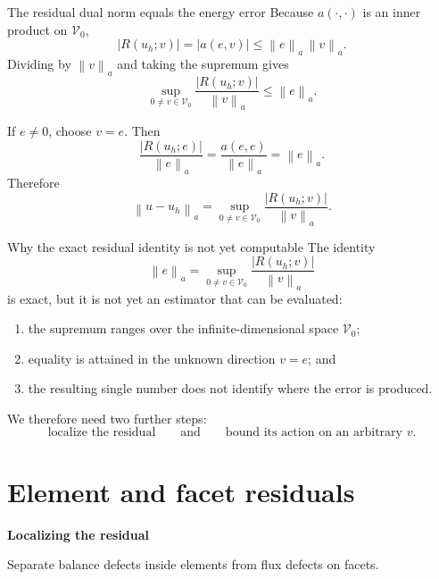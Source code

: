 \documentclass[11pt,aspectratio=169]{beamer}
\newcommand{\Vzero}{\mathcal V_0}
\newcommand{\norm}[2][]{\left\lVert#2\right\rVert_{#1}}
\begin{document}
\begin{frame}{The residual dual norm equals the energy error}
Because $a(\cdot,\cdot)$ is an inner product on $\Vzero$,
\[
  |R(u_h;v)|=|a(e,v)|
  \leq \norm[a]{e}\,\norm[a]{v}.
\]
Dividing by $\norm[a]{v}$ and taking the supremum gives
\[
  \sup_{0\neq v\in\Vzero}
  \frac{|R(u_h;v)|}{\norm[a]{v}}
  \leq \norm[a]{e}.
\]

If $e\neq0$, choose $v=e$. Then
\[
  \frac{|R(u_h;e)|}{\norm[a]{e}}
  =\frac{a(e,e)}{\norm[a]{e}}
  =\norm[a]{e}.
\]
Therefore
\[
  \boxed{
  \norm[a]{u-u_h}
  =\sup_{0\neq v\in\Vzero}
  \frac{|R(u_h;v)|}{\norm[a]{v}}.}
\]
\end{frame}

\begin{frame}{Why the exact residual identity is not yet computable}
The identity
\[
  \norm[a]{e}
  =\sup_{0\neq v\in\Vzero}
  \frac{|R(u_h;v)|}{\norm[a]{v}}
\]
is exact, but it is not yet an estimator that can be evaluated:

\begin{enumerate}
  \item the supremum ranges over the infinite-dimensional space $\Vzero$;
  \item equality is attained in the unknown direction $v=e$; and
  \item the resulting single number does not identify where the error is
  produced.
\end{enumerate}

\vspace{0.25cm}
We therefore need two further steps:
\[
  \boxed{\text{localize the residual}}
  \qquad\text{and}\qquad
  \boxed{\text{bound its action on an arbitrary }v.}
\]
\end{frame}

\section{Element and facet residuals}

\begin{frame}[plain]
  \centering\vfill
  {\LARGE\bfseries Localizing the residual\par}
  \vspace{0.4cm}
  {\large Separate balance defects inside elements from flux defects on facets.\par}
  \vfill
\end{frame}
\end{document}
